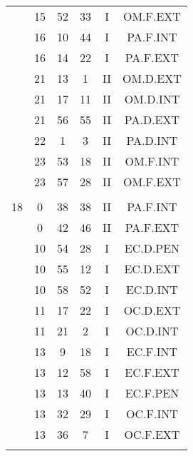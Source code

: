 \documentclass[12pt, a4paper]{article}
\begin{document}
\begin{multicols}{3}
{\begin{tabular}{c c c c c c}
	 	 	 	 & 15 & 52 & 33 & I & OM.F.EXT\\%
	 	 	 	 & 16 & 10 & 44 & I & PA.F.INT\\%
	 	 	 	 & 16 & 14 & 22 & I & PA.F.EXT\\%
	 	 	 	 & 21 & 13 & 1 & II & OM.D.EXT\\%
	 	 	 	 & 21 & 17 & 11 & II & OM.D.INT\\%
	 	 	 	 & 21 & 56 & 55 & II & PA.D.EXT\\%
	 	 	 	 & 22 & 1 & 3 & II & PA.D.INT\\%
	 	 	 	 & 23 & 53 & 18 & II & OM.F.INT\\%
	 	 	 	 & 23 & 57 & 28 & II & OM.F.EXT\\%
	 	 	 	 & & & & & \\%
	 	 	 	18 & 0 & 38 & 38 & II & PA.F.INT\\%
	 	 	 	 & 0 & 42 & 46 & II & PA.F.EXT\\%
	 	 	 	 & 10 & 54 & 28 & I & EC.D.PEN\\%
	 	 	 	 & 10 & 55 & 12 & I & EC.D.EXT\\%
	 	 	 	 & 10 & 58 & 52 & I & EC.D.INT\\%
	 	 	 	 & 11 & 17 & 22 & I & OC.D.EXT\\%
	 	 	 	 & 11 & 21 & 2 & I & OC.D.INT\\%
	 	 	 	 & 13 & 9 & 18 & I & EC.F.INT\\%
	 	 	 	 & 13 & 12 & 58 & I & EC.F.EXT\\%
	 	 	 	 & 13 & 13 & 40 & I & EC.F.PEN\\%
	 	 	 	 & 13 & 32 & 29 & I & OC.F.INT\\%
	 	 	 	 & 13 & 36 & 7 & I & OC.F.EXT\\%
	 	 	 	 & & & & & \\%

\end{tabular}}
\end{multicols}
\end{document}
